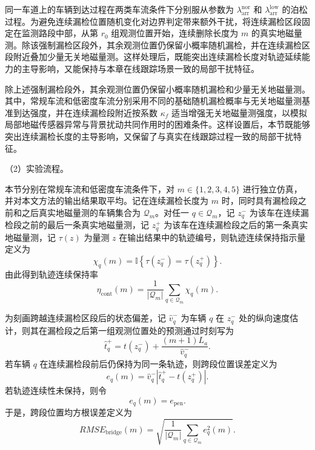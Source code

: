 \documentclass{xdupgthesis}
\begin{document}
同一车道上的车辆到达过程在两类车流条件下分别服从参数为 $\lambda_{\mathrm{arr}}^{\mathrm{nor}}$ 和 $\lambda_{\mathrm{arr}}^{\mathrm{low}}$ 的泊松过程。为避免连续漏检位置随机变化对边界判定带来额外干扰，将连续漏检区段固定在监测路段中部，从第 $r_0$ 组观测位置开始，连续删除长度为 $m$ 的真实地磁量测。除该强制漏检区段外，其余观测位置仍保留小概率随机漏检，并在连续漏检区段附近叠加少量无关地磁量测。这样处理后，既能突出连续漏检长度对轨迹延续能力的主导影响，又能保持与本章在线跟踪场景一致的局部干扰特征。

除上述强制漏检段外，其余观测位置仍保留小概率随机漏检和少量无关地磁量测。其中，常规车流和低密度车流分别采用不同的基础随机漏检概率与无关地磁量测基准到达强度，并在连续漏检段附近按系数 $\kappa_f$ 适当增强无关地磁量测强度，以模拟局部地磁传感器异常与背景扰动共同作用时的困难条件。这样设置后，本节既能够突出连续漏检长度的主导影响，又保留了与真实在线跟踪过程一致的局部干扰特征。

\noindent （2）实验流程。

本节分别在常规车流和低密度车流条件下，对 $m\in\{1,2,3,4,5\}$ 进行独立仿真，并对本文方法的输出结果取平均。记在连续漏检长度为 $m$ 时，同时具有漏检段之前和之后真实地磁量测的车辆集合为 $\mathcal Q_m$。对任一 $q\in\mathcal Q_m$，记 $z_q^{-}$ 为该车在连续漏检段之前的最后一条真实地磁量测，记 $z_q^{+}$ 为该车在连续漏检段之后的第一条真实地磁量测，记 $\tau(z)$ 为量测 $z$ 在输出结果中的轨迹编号，则轨迹连续保持指示量定义为
\begin{equation}
	\chi_q(m)
	=
	\mathbb I\left\{\tau(z_q^{-})=\tau(z_q^{+})\right\}.
\end{equation}
由此得到轨迹连续保持率
\begin{equation}
	\eta_{\mathrm{cont}}(m)
	=
	\frac{1}{\left|\mathcal Q_m\right|}
	\sum_{q\in\mathcal Q_m}\chi_q(m).
\end{equation}

为刻画跨越连续漏检区段后的状态偏差，记 $\hat v_q^{-}$ 为车辆 $q$ 在 $z_q^{-}$ 处的纵向速度估计，则其在漏检段之后第一组观测位置处的预测通过时刻写为
\begin{equation}
	\hat t_q^{+}
	=
	t(z_q^{-})+\frac{(m+1)L_a}{\hat v_q^{-}}.
\end{equation}
若车辆 $q$ 在连续漏检段前后仍保持为同一条轨迹，则跨段位置误差定义为
\begin{equation}
	e_q(m)
	=
	\hat v_q^{-}\left|\hat t_q^{+}-t(z_q^{+})\right|.
\end{equation}
若轨迹连续性未保持，则令
\begin{equation}
	e_q(m)
	=
	e_{\mathrm{pen}}.
\end{equation}
于是，跨段位置均方根误差定义为
\begin{equation}
	RMSE_{\mathrm{bridge}}(m)
	=
	\sqrt{
		\frac{1}{\left|\mathcal Q_m\right|}
		\sum_{q\in\mathcal Q_m}e_q^2(m)
	}.
\end{equation}
\end{document}
